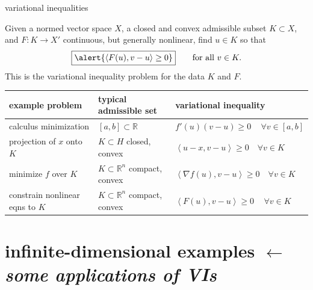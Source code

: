 \documentclass[aspectratio=169,10pt]{beamer}
\newcommand{\RR}{{\mathbb{R}}}
\newcommand{\ip}[2]{\left\langle #1, #2 \right\rangle}
\begin{document}
\begin{frame}{variational inequalities}

\begin{definitions}
Given a normed vector space $X$, a closed and convex \alert{admissible subset} $K\subset X$, and $F: K\to X'$ continuous, but generally nonlinear, find $u\in K$ so that
  $$\boxed{\alert{\ip{F(u)}{v-u} \ge 0}} \qquad \text{for all } v\in K.$$
This is the \alert{variational inequality} problem for the data $K$ and $F$.
\end{definitions}

\bigskip
  {\centering\small
    \begin{tabular}{lll}
      example problem             & typical admissible set           & variational inequality \\
      \midrule
      calculus minimization       & $[a,b]\subset\RR$                & $f'(u)(v-u) \ge 0 \quad\,\forall v\in [a,b]$ \\
      projection of $x$ onto $K$  & $K\subset H$ closed, convex        & $\ip{u-x}{v-u} \ge 0 \quad\forall v\in K$ \\
      minimize $f$ over $K$       & $K\subset \RR^n$ compact, convex    & $\ip{\nabla f(u)}{v-u} \ge 0 \quad\forall v\in K$ \\
      constrain nonlinear eqns to $K$ & $K\subset \RR^n$ compact, convex   & $\ip{F(u)}{v-u} \ge 0 \quad\,\forall v\in K$ \\
      \bottomrule
    \end{tabular}
  \par}

\bigskip
{\small {}}
\end{frame}



\section[infinite-dimensional examples]{infinite-dimensional examples \hfill {\small \texorpdfstring{$\leftarrow$}{←} \emph{some applications of VIs}}}
\end{document}
